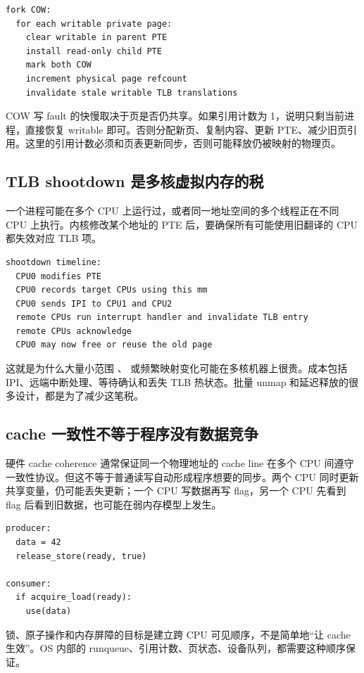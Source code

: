 \begin{lstlisting}
fork COW:
  for each writable private page:
    clear writable in parent PTE
    install read-only child PTE
    mark both COW
    increment physical page refcount
    invalidate stale writable TLB translations
\end{lstlisting}

COW 写 fault 的快慢取决于页是否仍共享。如果引用计数为 1，说明只剩当前进程，直接恢复 writable 即可。否则分配新页、复制内容、更新 PTE、减少旧页引用。这里的引用计数必须和页表更新同步，否则可能释放仍被映射的物理页。

\subsection{TLB shootdown 是多核虚拟内存的税}

一个进程可能在多个 CPU 上运行过，或者同一地址空间的多个线程正在不同 CPU 上执行。内核修改某个地址的 PTE 后，要确保所有可能使用旧翻译的 CPU 都失效对应 TLB 项。

\begin{lstlisting}
shootdown timeline:
  CPU0 modifies PTE
  CPU0 records target CPUs using this mm
  CPU0 sends IPI to CPU1 and CPU2
  remote CPUs run interrupt handler and invalidate TLB entry
  remote CPUs acknowledge
  CPU0 may now free or reuse the old page
\end{lstlisting}

这就是为什么大量小范围 、 或频繁映射变化可能在多核机器上很贵。成本包括 IPI、远端中断处理、等待确认和丢失 TLB 热状态。批量 unmap 和延迟释放的很多设计，都是为了减少这笔税。

\subsection{cache 一致性不等于程序没有数据竞争}

硬件 cache coherence 通常保证同一个物理地址的 cache line 在多个 CPU 间遵守一致性协议。但这不等于普通读写自动形成程序想要的同步。两个 CPU 同时更新共享变量，仍可能丢失更新；一个 CPU 写数据再写 flag，另一个 CPU 先看到 flag 后看到旧数据，也可能在弱内存模型上发生。

\begin{lstlisting}
producer:
  data = 42
  release_store(ready, true)

consumer:
  if acquire_load(ready):
    use(data)
\end{lstlisting}

锁、原子操作和内存屏障的目标是建立跨 CPU 可见顺序，不是简单地“让 cache 生效”。OS 内部的 runqueue、引用计数、页状态、设备队列，都需要这种顺序保证。

